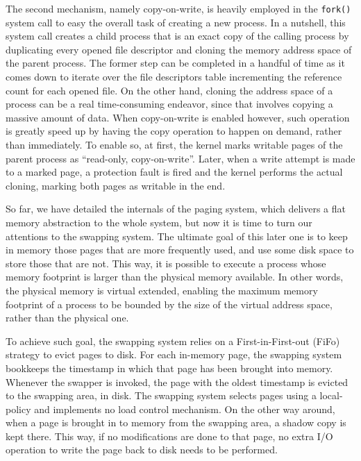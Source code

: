 	The second mechanism, namely copy-on-write, is heavily employed in
	the \texttt{fork()} system call to easy the overall task of creating
	a new process. In a nutshell, this system call creates a child
	process that is an exact copy of the calling process by duplicating
	every opened file descriptor and cloning the memory address space of
	the parent process. The former step can be completed in a handful of
	time as it comes down to iterate over the file descriptors table
	incrementing the reference count for each opened file. On the other
	hand, cloning the address space of a process can be a real
	time-consuming endeavor, since that involves copying a massive
	amount of data. When copy-on-write is enabled however, such
	operation is greatly speed up by having the copy operation to happen
	on demand, rather than immediately. To enable so, at first, the
	kernel marks writable pages of the parent process as ``read-only,
	copy-on-write''. Later, when a write attempt is made to a marked
	page, a protection fault is fired and the kernel performs the actual
	cloning, marking both pages as writable in the end.

	So far, we have detailed the internals of the paging system, which
	delivers a flat memory abstraction to the whole system, but now it
	is time to turn our attentions to the swapping system. The ultimate
	goal of this later one is to keep in memory those pages that are
	more frequently used, and use some disk space to store those that
	are not. This way, it is possible to execute a process whose memory
	footprint is larger than the physical memory available. In other
	words, the physical memory is virtual extended, enabling the maximum
	memory footprint of a process to be bounded by the size of the
	virtual address space, rather than the physical one.

	To achieve such goal, the swapping system relies on a
	First-in-First-out (FiFo) strategy to evict pages to disk. For each
	in-memory page, the swapping system bookkeeps the timestamp in which
	that page has been brought into memory. Whenever the swapper is
	invoked, the page with the oldest timestamp is evicted to the
	swapping area, in disk. The swapping system selects pages using a
	local-policy and implements no load control mechanism. On the other
	way around, when a page is brought in to memory from the swapping
	area, a shadow copy is kept there. This way, if no modifications are
	done to that page, no extra I/O operation to write the page back to
	disk needs to be performed.
